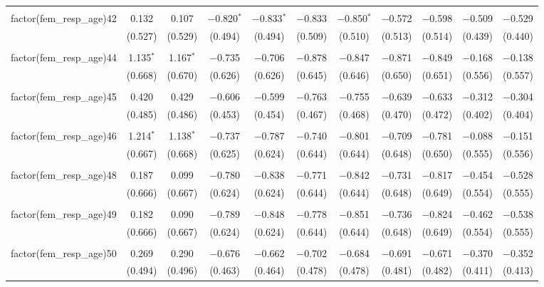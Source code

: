 \begin{table}[!htbp]
\begin{tabular}{@{\extracolsep{5pt}}lcccccccccc}
  & & & & & & & & & & \\ 
 factor(fem\_resp\_age)42 & 0.132 & 0.107 & $-$0.820$^{*}$ & $-$0.833$^{*}$ & $-$0.833 & $-$0.850$^{*}$ & $-$0.572 & $-$0.598 & $-$0.509 & $-$0.529 \\ 
  & (0.527) & (0.529) & (0.494) & (0.494) & (0.509) & (0.510) & (0.513) & (0.514) & (0.439) & (0.440) \\ 
  & & & & & & & & & & \\ 
 factor(fem\_resp\_age)44 & 1.135$^{*}$ & 1.167$^{*}$ & $-$0.735 & $-$0.706 & $-$0.878 & $-$0.847 & $-$0.871 & $-$0.849 & $-$0.168 & $-$0.138 \\ 
  & (0.668) & (0.670) & (0.626) & (0.626) & (0.645) & (0.646) & (0.650) & (0.651) & (0.556) & (0.557) \\ 
  & & & & & & & & & & \\ 
 factor(fem\_resp\_age)45 & 0.420 & 0.429 & $-$0.606 & $-$0.599 & $-$0.763 & $-$0.755 & $-$0.639 & $-$0.633 & $-$0.312 & $-$0.304 \\ 
  & (0.485) & (0.486) & (0.453) & (0.454) & (0.467) & (0.468) & (0.470) & (0.472) & (0.402) & (0.404) \\ 
  & & & & & & & & & & \\ 
 factor(fem\_resp\_age)46 & 1.214$^{*}$ & 1.138$^{*}$ & $-$0.737 & $-$0.787 & $-$0.740 & $-$0.801 & $-$0.709 & $-$0.781 & $-$0.088 & $-$0.151 \\ 
  & (0.667) & (0.668) & (0.625) & (0.624) & (0.644) & (0.644) & (0.648) & (0.650) & (0.555) & (0.556) \\ 
  & & & & & & & & & & \\ 
 factor(fem\_resp\_age)48 & 0.187 & 0.099 & $-$0.780 & $-$0.838 & $-$0.771 & $-$0.842 & $-$0.731 & $-$0.817 & $-$0.454 & $-$0.528 \\ 
  & (0.666) & (0.667) & (0.624) & (0.624) & (0.644) & (0.644) & (0.648) & (0.649) & (0.554) & (0.555) \\ 
  & & & & & & & & & & \\ 
 factor(fem\_resp\_age)49 & 0.182 & 0.090 & $-$0.789 & $-$0.848 & $-$0.778 & $-$0.851 & $-$0.736 & $-$0.824 & $-$0.462 & $-$0.538 \\ 
  & (0.666) & (0.667) & (0.624) & (0.624) & (0.644) & (0.644) & (0.648) & (0.649) & (0.554) & (0.555) \\ 
  & & & & & & & & & & \\ 
 factor(fem\_resp\_age)50 & 0.269 & 0.290 & $-$0.676 & $-$0.662 & $-$0.702 & $-$0.684 & $-$0.691 & $-$0.671 & $-$0.370 & $-$0.352 \\ 
  & (0.494) & (0.496) & (0.463) & (0.464) & (0.478) & (0.478) & (0.481) & (0.482) & (0.411) & (0.413) \\ 

\end{tabular}
\end{table}
